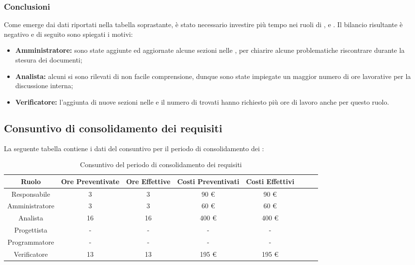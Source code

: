 \subsubsection{Conclusioni}
Come emerge dai dati riportati nella tabella soprastante, è stato necessario investire più tempo nei ruoli di \adm{}, \ana{} e \ver{}. Il bilancio risultante è negativo e di seguito sono spiegati i motivi:
\begin{itemize}
\item \textbf{Amministratore:} sono state aggiunte ed aggiornate alcune sezioni nelle \NdP{}, per chiarire alcune problematiche riscontrare durante la stesura dei documenti;
\item \textbf{Analista:} alcuni  si sono rilevati di non facile comprensione, dunque sono state impiegate un maggior numero di ore lavorative per la discussione interna;
\item \textbf{Verificatore:} l'aggiunta di nuove sezioni nelle \NdP{} e il numero di  trovati hanno richiesto più ore di lavoro anche per questo ruolo.
\end{itemize}


\subsection{Consuntivo di consolidamento dei requisiti}
La seguente tabella contiene i dati del consuntivo per il periodo di consolidamento dei :
\begin{table}[H]
		\begin{center}
			\setlength{\aboverulesep}{0pt}
			\setlength{\belowrulesep}{0pt}
			\setlength{\extrarowheight}{.75ex}
			\begin{tabular}{ c c c c c c c c }
				\rowcolor{AzzurroGruppo!30} 
				\textbf{Ruolo} & \textbf{Ore Preventivate} & \textbf{Ore Effettive} & \textbf{Costi Preventivati} & \textbf{Costi Effettivi}\\
				\toprule
				Responsabile   & 3 & 3 & 90 \euro{}  & 90 \euro{} \\
				Amministratore & 3 & 3 & 60 \euro{}  & 60 \euro{} \\
				Analista       & 16 & 16 & 400 \euro{}  & 400 \euro{} \\
				Progettista    & - & - & - & - \\
				Programmatore  & - & - & - & - \\
				Verificatore   & 13 & 13 & 195 \euro{}  & 195 \euro{} \\
				\bottomrule
			\end{tabular}
			\caption{Consuntivo del periodo di consolidamento dei requisiti}
		\end{center}
	\end{table}
	

